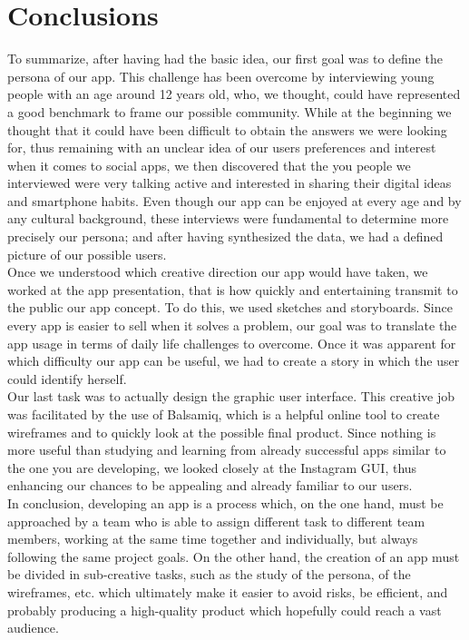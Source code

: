 \documentclass[12pt]{scrartcl}
\begin{document}
	
\section{Conclusions}

	
	To summarize, after having had the basic idea, our first goal was to define the persona of our app. This challenge has been overcome by interviewing young people with an age around 12 years old, who, we thought, could have represented a good benchmark to frame our possible community. While at the beginning we thought that it could have been difficult to obtain the answers we were looking for, thus remaining with an unclear idea of our users preferences and interest when it comes to social apps, we then discovered that the you people we interviewed were very talking active and interested in sharing their digital ideas and smartphone habits. Even though our app can be enjoyed at every age and by any cultural background, these interviews were fundamental to determine more precisely our persona; and after having synthesized the data, we had a defined picture of our possible users.\\
	
	Once we understood which creative direction our app would have taken, we worked at the app presentation, that is how quickly and entertaining transmit to the public our app concept. To do this, we used sketches and storyboards. Since every app is easier to sell when it solves a problem, our goal was to translate the app usage in terms of daily life challenges to overcome. Once it was apparent for which difficulty our app can be useful, we had to create a story in which the user could identify herself.\\
  
	Our last task was to actually design the graphic user interface. This creative job was facilitated by the use of Balsamiq, which is a helpful online tool to create wireframes and to quickly look at the possible final product. Since nothing is more useful than studying and learning from already successful apps similar to the one you are developing, we looked closely at the Instagram GUI, thus enhancing our chances to be appealing and already familiar to our users.\\
  
	In conclusion, developing an app is a process which, on the one hand, must be approached by a team who is able to assign different task to different team members, working at the same time together and individually, but always following the same project goals. On the other hand, the creation of an app must be divided in sub-creative tasks, such as the study of the persona, of the wireframes, etc. which ultimately make it easier to avoid risks, be efficient, and probably producing a high-quality product which hopefully could reach a vast audience.\\
\end{document}
